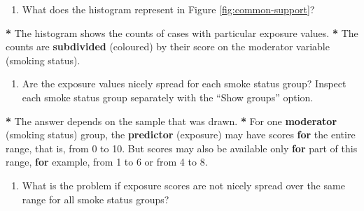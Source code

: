 \documentclass[a4paper]{book}
\newenvironment{Shaded}{\begin{snugshade}}{\end{snugshade}}
\newcommand{\KeywordTok}[1]{\textcolor[rgb]{0,0,0}{\textbf{#1}}}
\newcommand{\DecValTok}[1]{\textcolor[rgb]{0.00,0.00,0.00}{#1}}
\newcommand{\StringTok}[1]{\textcolor[rgb]{0.00,0.00,0.00}{#1}}
\newcommand{\ControlFlowTok}[1]{\textcolor[rgb]{0.00,0.00,0.00}{\textbf{#1}}}
\newcommand{\OperatorTok}[1]{\textcolor[rgb]{0.00,0.00,0.00}{\textbf{#1}}}
\newcommand{\NormalTok}[1]{#1}
\providecommand{\tightlist}{%
  \setlength{\itemsep}{0pt}\setlength{\parskip}{0pt}}
\theoremstyle{definition}
\theoremstyle{definition}
\theoremstyle{definition}
\theoremstyle{remark}
\begin{document}
\begin{enumerate}
\def\labelenumi{\arabic{enumi}.}
\tightlist
\item
  What does the histogram represent in Figure \ref{fig:common-support}?
\end{enumerate}

\begin{Shaded}
\begin{Highlighting}[]
\OperatorTok{*}\StringTok{ }\NormalTok{The histogram shows the counts of cases with particular exposure values.}
\OperatorTok{*}\StringTok{ }\NormalTok{The counts are }\KeywordTok{subdivided}\NormalTok{ (coloured) by their score on the moderator variable}
\NormalTok{(smoking status).}
\end{Highlighting}
\end{Shaded}

\begin{enumerate}
\def\labelenumi{\arabic{enumi}.}
\setcounter{enumi}{1}
\tightlist
\item
  Are the exposure values nicely spread for each smoke status group?
  Inspect each smoke status group separately with the ``Show groups''
  option.
\end{enumerate}

\begin{Shaded}
\begin{Highlighting}[]
\OperatorTok{*}\StringTok{ }\NormalTok{The answer depends on the sample that was drawn.}
\OperatorTok{*}\StringTok{ }\NormalTok{For one }\KeywordTok{moderator}\NormalTok{ (smoking status) group, the }\KeywordTok{predictor}\NormalTok{ (exposure) may have}
\NormalTok{scores }\ControlFlowTok{for}\NormalTok{ the entire range, that is, from }\DecValTok{0}\NormalTok{ to }\DecValTok{10}\NormalTok{. But scores may also be}
\NormalTok{available only }\ControlFlowTok{for}\NormalTok{ part of this range, }\ControlFlowTok{for}\NormalTok{ example, from }\DecValTok{1}\NormalTok{ to }\DecValTok{6}\NormalTok{ or from }\DecValTok{4}\NormalTok{ to}
\DecValTok{8}\NormalTok{.}
\end{Highlighting}
\end{Shaded}

\begin{enumerate}
\def\labelenumi{\arabic{enumi}.}
\setcounter{enumi}{2}
\tightlist
\item
  What is the problem if exposure scores are not nicely spread over the
  same range for all smoke status groups?
\end{enumerate}
\end{document}
